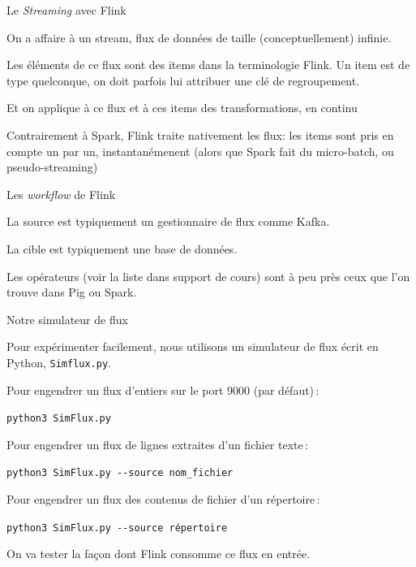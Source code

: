 
\begin{frame}{Le \textit{Streaming} avec Flink}

On a affaire à un \alert{stream}, flux de données de taille (conceptuellement) infinie.

\vfill

Les éléments de ce flux sont des \alert{item}s dans la terminologie Flink. Un item est de type quelconque,
on doit parfois lui attribuer une clé de regroupement.

\vfill

Et on applique à ce flux et à ces items des \alert{transformations}, en continu

\vfill
\begin{blocgauche}
Contrairement à Spark, Flink traite nativement les flux: les items sont pris en compte
un par un, instantanémenent (alors que Spark fait du micro-batch, ou pseudo-streaming)
\end{blocgauche}
\end{frame}


\begin{frame}{Les \textit{workflow} de Flink}

La source est typiquement un gestionnaire de flux comme Kafka.
\vfill


\vfill

La cible est typiquement une base de données. 

\vfill
\begin{blocgauche}
Les opérateurs (voir la liste dans support de cours) sont à peu près ceux que l'on trouve dans Pig ou Spark.
\end{blocgauche}
\end{frame}

\begin{frame}{Notre simulateur de flux}

Pour expérimenter facilement, nous utilisons un simulateur de flux écrit en Python, \texttt{Simflux.py}. 

\vfill

\begin{redbullet}

  \item Pour engendrer un flux d'entiers sur le port 9000 (par défaut)\,: 
  
   \texttt{python3 SimFlux.py}

\item Pour engendrer un flux de lignes extraites d'un fichier texte\,: 

 \texttt{python3 SimFlux.py {-}-source nom\_fichier}

\item Pour engendrer un flux des contenus de fichier d'un répertoire\,:  

  \texttt{python3 SimFlux.py {-}-source répertoire}

\end{redbullet}

\vfill

On va tester la façon dont Flink consomme ce flux en entrée.
\end{frame}


